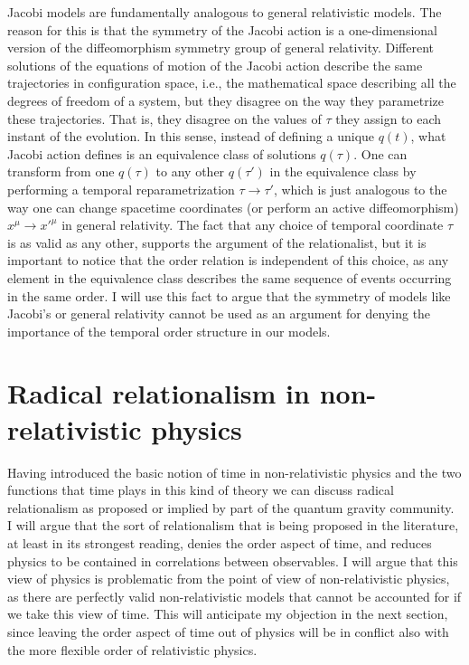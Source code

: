 \documentclass[12 pt]{article}
\begin{document}
Jacobi models are fundamentally analogous to general relativistic models. The reason for this is that the symmetry of the Jacobi action is a one-dimensional version of the diffeomorphism symmetry group of general relativity. Different solutions of the equations of motion of the Jacobi action describe the same trajectories in configuration space, i.e., the mathematical space describing all the degrees of freedom of a system, but they disagree on the way they parametrize these trajectories. That is, they disagree on the values of $\tau$ they assign to each instant of the evolution. In this sense, instead of defining a unique $q(t)$, what Jacobi action defines is an equivalence class of solutions $q(\tau)$. One can transform from one $q(\tau)$ to any other $q(\tau ')$ in the equivalence class by performing a temporal reparametrization $\tau \rightarrow \tau '$, which is just analogous to the way one can change spacetime coordinates (or perform an active diffeomorphism) $x^{\mu} \rightarrow x'^{\mu}$ in general relativity. The fact that any choice of temporal coordinate $\tau$ is as valid as any other, supports the argument of the relationalist, but it is important to notice that the order relation is independent of this choice, as any element in the equivalence class describes the same sequence of events occurring in the same order. I will use this fact to argue that the symmetry of models like Jacobi's or general relativity cannot be used as an argument for denying the importance of the temporal order structure in our models.

\section{Radical relationalism in non-relativistic physics}\label{sect_relationalism_non-rel}

Having introduced the basic notion of time in non-relativistic physics and the two functions that time plays in this kind of theory we can discuss radical relationalism as proposed or implied by part of the quantum gravity community. I will argue that the sort of relationalism that is being proposed in the literature, at least in its strongest reading, denies the order aspect of time, and reduces physics to be contained in correlations between observables. I will argue that this view of physics is problematic from the point of view of non-relativistic physics, as there are perfectly valid non-relativistic models that cannot be accounted for if we take this view of time. This will anticipate my objection in the next section, since leaving the order aspect of time out of physics will be in conflict also with the more flexible order of relativistic physics.
\end{document}
